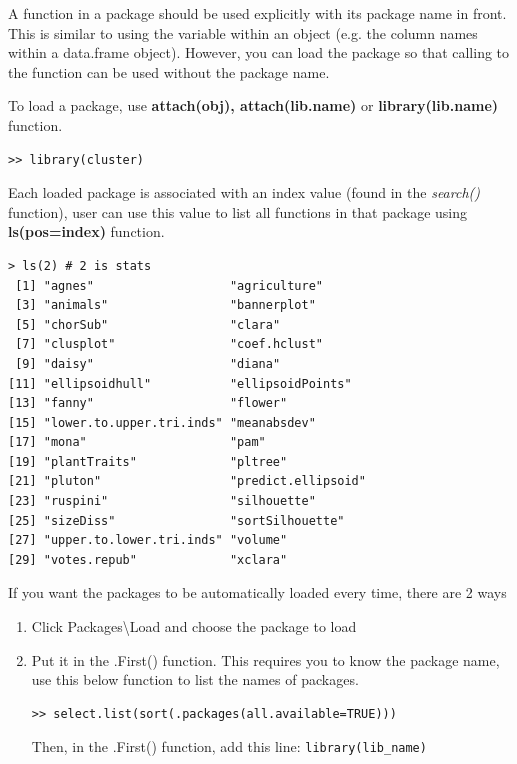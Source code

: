 A function in a package should be used explicitly with its package
name in front. This is similar to using the variable within an object
(e.g. the column names within a data.frame object).  However, you can
load the package so that calling to the function can be used without
the package name.


\textbullet To load a package, use {\bf attach(obj), attach(lib.name)}
or {\bf library(lib.name)} function.
\begin{lstlisting}
>> library(cluster)
\end{lstlisting}

\textbullet Each loaded package is associated with an index value
(found in the {\it search()} function), user can use this value to
list all functions in that package using {\bf ls(pos=index)} function.
\begin{lstlisting}
> ls(2) # 2 is stats
 [1] "agnes"                   "agriculture"            
 [3] "animals"                 "bannerplot"             
 [5] "chorSub"                 "clara"                  
 [7] "clusplot"                "coef.hclust"            
 [9] "daisy"                   "diana"                  
[11] "ellipsoidhull"           "ellipsoidPoints"        
[13] "fanny"                   "flower"                 
[15] "lower.to.upper.tri.inds" "meanabsdev"             
[17] "mona"                    "pam"                    
[19] "plantTraits"             "pltree"                 
[21] "pluton"                  "predict.ellipsoid"      
[23] "ruspini"                 "silhouette"             
[25] "sizeDiss"                "sortSilhouette"         
[27] "upper.to.lower.tri.inds" "volume"                 
[29] "votes.repub"             "xclara"    
\end{lstlisting}

  \textbullet If you want the packages to be automatically loaded
  every time, there are 2 ways 

  \begin{enumerate}
  \item Click Packages\textbackslash Load and choose the
  package to load 
  \item Put it in the .First() function. This requires you
  to know the package name, use this below function to list the names
  of packages.  
\begin{lstlisting}
>> select.list(sort(.packages(all.available=TRUE)))
\end{lstlisting}
  Then, in the .First() function, add this line: \lstinline!library(lib_name)!
  \end{enumerate}

